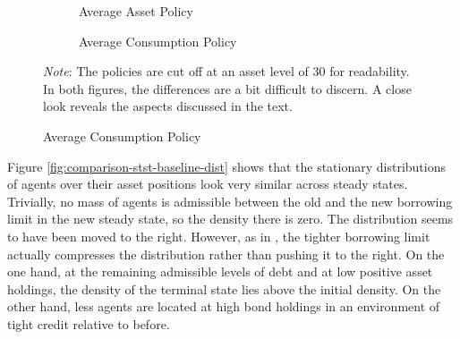 \documentclass[a4paper,12pt]{article} %
\numberwithin{equation}{section} %
\numberwithin{figure}{section}
\numberwithin{table}{section}
\begin{document}
\begin{figure}[t]
    \caption{Baseline Model -- Shock to the Borrowing Limit: Household Policies}
    \label{fig:comparison-stst-baseline-policies}
    \centering
    \begin{subfigure}[b]{0.49\textwidth}
    \caption{Average Asset Policy}
    \label{fig:comparison-stst-baseline-policies-a}
         \centering
         
     \end{subfigure}
     \hfill
     \begin{subfigure}[b]{0.49\textwidth}
     \caption{Average Consumption Policy}
     \label{fig:comparison-stst-baseline-policies-c}
         \centering
         
     \end{subfigure}

    \vspace{10pt}
     
     \justifying
     \footnotesize
	\textit{Note}: The policies are cut off at an asset level of $30$ for readability. In both figures, the differences are a bit difficult to discern. A close look reveals the aspects discussed in the text.
\end{figure}

Figure \ref{fig:comparison-stst-baseline-dist} shows that the stationary distributions of agents over their asset positions look very similar across steady states. Trivially, no mass of agents is admissible between the old and the new borrowing limit in the new steady state, so the density there is zero. The distribution seems to have been moved to the right. However, as in \textcite{gl2017}, the tighter borrowing limit actually compresses the distribution rather than pushing it to the right. On the one hand, at the remaining admissible levels of debt and at low positive asset holdings, the density of the terminal state lies above the initial density. On the other hand, less agents are located at high bond holdings in an environment of tight credit relative to before.
\end{document}
